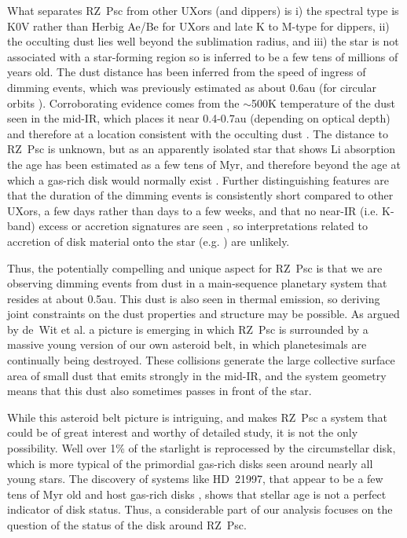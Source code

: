 \documentclass[]{rsos}
\begin{document}
What separates RZ~Psc from other UXors (and dippers) is i) the spectral type is K0V
rather than Herbig Ae/Be for UXors and late K to M-type for dippers, ii) the occulting
dust lies well beyond the sublimation radius, and iii) the star is not associated with a
star-forming region so is inferred to be a few tens of millions of years old. The dust
distance has been inferred from the speed of ingress of dimming events, which was
previously estimated as about 0.6au (for circular orbits
\cite{2013A&A...553L...1D}). Corroborating evidence comes from the $\sim$500K temperature
of the dust seen in the mid-IR, which places it near 0.4-0.7au (depending on optical
depth) and therefore at a location consistent with the occulting dust
\cite{2013A&A...553L...1D}. The distance to RZ~Psc is unknown, but as an apparently
isolated star that shows Li absorption the age has been estimated as a few tens of Myr,
and therefore beyond the age at which a gas-rich disk would normally exist
\cite{2010A&A...524A...8G,2014A&A...563A.139P}. Further distinguishing features are that
the duration of the dimming events is consistently short compared to other UXors, a few
days rather than days to a few weeks, and that no near-IR (i.e. K-band) excess or
accretion signatures are seen \cite{2014A&A...563A.139P}, so interpretations related to
accretion of disk material onto the star
(e.g. \cite{1999AJ....118.1043H,1999A&A...349..619B,2016arXiv160503985B}) are unlikely.

Thus, the potentially compelling and unique aspect for RZ~Psc is that we are observing
dimming events from dust in a main-sequence planetary system that resides at about
0.5au. This dust is also seen in thermal emission, so deriving joint constraints on the
dust properties and structure may be possible. As argued by de~Wit et
al. \cite{2013A&A...553L...1D} a picture is emerging in which RZ~Psc is surrounded by a
massive young version of our own asteroid belt, in which planetesimals are continually
being destroyed. These collisions generate the large collective surface area of small
dust that emits strongly in the mid-IR, and the system geometry means that this dust also
sometimes passes in front of the star.

While this asteroid belt picture is intriguing, and makes RZ~Psc a system that could be
of great interest and worthy of detailed study, it is not the only possibility. Well over
1\% of the starlight is reprocessed by the circumstellar disk, which is more typical of
the primordial gas-rich disks seen around nearly all young stars. The discovery of
systems like HD~21997, that appear to be a few tens of Myr old and host gas-rich disks
\cite{2013ApJ...776...77K}, shows that stellar age is not a perfect indicator of disk
status. Thus, a considerable part of our analysis focuses on the question of the status
of the disk around RZ~Psc.
\end{document}
